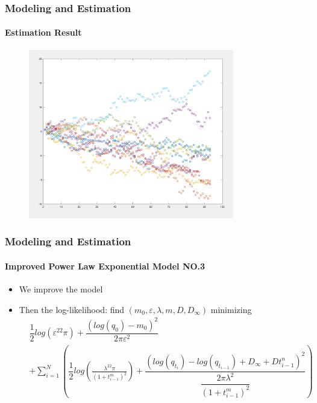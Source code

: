 \documentclass[11pt]{beamer}
\begin{document}
				
\begin{frame}
	\frametitle{Modeling and Estimation}
	\framesubtitle{Estimation Result}
	\justifying
	\begin{figure}
		\begin{center}
			\includegraphics[width=0.8\textwidth  ]{like.PNG} 			
		\end{center}
	\end{figure}
\end{frame}		
	
				
\begin{frame}
	\frametitle{Modeling and Estimation}
	\framesubtitle{Improved Power Law Exponential Model NO.3}
	\justifying
	\begin{itemize}
		\item We improve the model
		\item Then the log-likelihood: find $(m_0,\varepsilon,\lambda,m,D,D_{\infty})$ minimizing
		      \begin{eqnarray*}
		      	&\dfrac{1}{2}log(\varepsilon^22\pi)+\dfrac{(log(q_0)-m_0)^2}{2 \pi \varepsilon^2} \\
		      	&+\sum_{i=1}^N\left(\dfrac{1}{2}log(\frac{\lambda^22\pi}{(1+t_{i-1}^m)^2})+\dfrac{(log(q_{t_i})-log(q_{t_{i-1}})+D_\infty+Dt_{i-1}^n)^2}{\dfrac{2\pi\lambda^2}{(1+t^m_{i-1})^2}}\right)
		      \end{eqnarray*}
	\end{itemize}		
\end{frame}	
	
\end{document}
